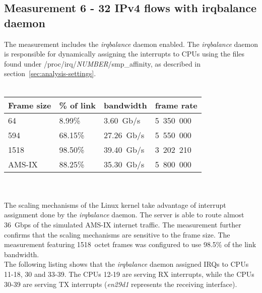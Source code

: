 
\subsection{Measurement 6 - 32 IPv4 flows with irqbalance daemon}
The measurement includes the {\it{irqbalance}} daemon enabled.
The {\it{irqbalance}} daemon is responsible for dynamically assigning the interrupts to CPUs
using the files found under /proc/irq/{\it{NUMBER}}/smp\_affinity,
as described in section~\ref{sec:analysis-settings}.
\\
\\
\begin{tabular}{ | l | l | l | l | }
\hline
Frame size & \% of link & bandwidth & frame rate \\
\hline
64     &  8.99\% &  3.60~Gb/s & 5~350~000 \\
594    & 68.15\% & 27.26~Gb/s & 5~550~000 \\
1518   & 98.50\% & 39.40~Gb/s & 3~202~210 \\
AMS-IX & 88.25\% & 35.30~Gb/s & 5~800~000 \\
\hline
\end{tabular}
\\
\\
The scaling mechanisms of the Linux kernel take advantage of interrupt assignment
done by the {\it{irqbalance}} daemon.
The server is able to route almost 36~Gbps of the simulated AMS-IX internet traffic.
The measurement further confirms that the scaling mechanisms are sensitive to the frame size.
The measurement featuring 1518~octet frames was configured to use 98.5\% of the link bandwidth.
\\
The following listing shows that the {\it{irqbalance}} daemon assigned IRQs to CPUs 11-18, 30 and 33-39.
The CPUs 12-19 are serving RX interrupts, while the CPUs 30-39 are serving TX interrupts
({\it{en29d1}} represents the receiving interface).

\newpage


